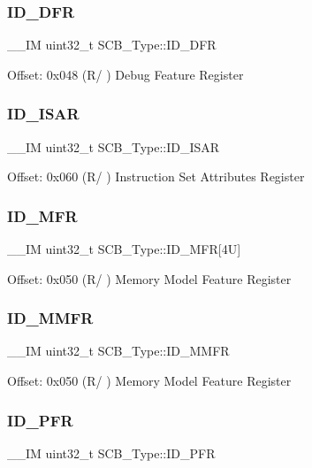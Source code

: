 \subsubsection{\texorpdfstring{ID\_DFR}{ID\_DFR}}
{\footnotesize\ttfamily \+\_\+\+\_\+\+IM uint32\+\_\+t S\+C\+B\+\_\+\+Type\+::\+I\+D\+\_\+\+D\+FR}

Offset\+: 0x048 (R/ ) Debug Feature Register \mbox{\label{struct_s_c_b___type_a5be03d185d9bde32c5b9028f792f8e1e}} 
\subsubsection{\texorpdfstring{ID\_ISAR}{ID\_ISAR}}
{\footnotesize\ttfamily \+\_\+\+\_\+\+IM uint32\+\_\+t S\+C\+B\+\_\+\+Type\+::\+I\+D\+\_\+\+I\+S\+AR}

Offset\+: 0x060 (R/ ) Instruction Set Attributes Register \mbox{\label{struct_s_c_b___type_a781ef24d88610a432e7d5b179d78de47}} 
\subsubsection{\texorpdfstring{ID\_MFR}{ID\_MFR}}
{\footnotesize\ttfamily \+\_\+\+\_\+\+IM uint32\+\_\+t S\+C\+B\+\_\+\+Type\+::\+I\+D\+\_\+\+M\+FR\mbox{[}4\+U\mbox{]}}

Offset\+: 0x050 (R/ ) Memory Model Feature Register \mbox{\label{struct_s_c_b___type_ad3ce108b65d07e91c4a1054d50e4bd8a}} 
\subsubsection{\texorpdfstring{ID\_MMFR}{ID\_MMFR}}
{\footnotesize\ttfamily \+\_\+\+\_\+\+IM uint32\+\_\+t S\+C\+B\+\_\+\+Type\+::\+I\+D\+\_\+\+M\+M\+FR}

Offset\+: 0x050 (R/ ) Memory Model Feature Register \mbox{\label{struct_s_c_b___type_a7a23d21186bc6aa71855a68666202984}} 
\subsubsection{\texorpdfstring{ID\_PFR}{ID\_PFR}}
{\footnotesize\ttfamily \+\_\+\+\_\+\+IM uint32\+\_\+t S\+C\+B\+\_\+\+Type\+::\+I\+D\+\_\+\+P\+FR}

